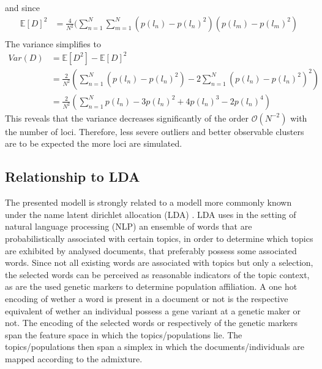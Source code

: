 \documentclass[a4paper, 11pt]{article}
\begin{document}
and since
\begin{align*}
\mathbb{E}[D]^2 &= \frac{4}{N^2}( \sum^{N}_{n = 1}\sum^{N}_{m = 1} (p(l_n) - p(l_n)^2)(p(l_m)-p(l_m)^2)\\
\end{align*}
The variance simplifies to
\begin{align*}
Var(D) &= \mathbb{E}[D^2] - \mathbb{E}[D]^2\\
&= \frac{2}{N^2} (\sum^{N}_{n = 1} (p(l_n) - p(l_n)^2) - 2\sum^{N}_{n = 1} (p(l_n) - p(l_n)^2)^2) \\
&= \frac{2}{N^2} (\sum^{N}_{n = 1} p(l_n) - 3p(l_n)^2 + 4p(l_n)^3 - 2p(l_n)^4)
\end{align*}
This reveals that the variance decreases significantly of the order $\mathcal{O}(N^{-2})$ with the number of loci. Therefore, less severe outliers and better observable clusters are to be expected the more loci are simulated.

\subsection{Relationship to LDA}
The presented modell is strongly related to a modell more commonly known under the name latent dirichlet allocation (LDA) \cite{blei2003latent}. LDA uses in the setting of natural language processing (NLP) an ensemble of words that are probabilistically associated with certain topics, in order to determine which topics are exhibited by analysed documents, that preferably possess some associated words. Since not all existing words are associated with topics but only a selection, the selected words can be perceived as reasonable indicators of the topic context, as are the used genetic markers to determine population affiliation. A one hot encoding of wether a word is present in a document or not is the respective equivalent of wether an individual possess a gene variant at a genetic maker or not. The encoding of the selected words or respectively of the genetic markers span the feature space in which the topics/populations lie. The topics/populations then span a simplex in which the documents/individuals are mapped according to the admixture. \\

\end{document}
